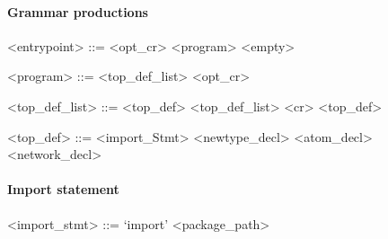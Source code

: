 \newcommand{\pn}[1]{\langle \textnormal{#1} \rangle}
\newcommand{\pp}{\models}
\newcommand{\oo}{\; \mid \;}
\newcommand{\sk}{\dots }
\newcommand{\ww}{\;}
\newcommand{\nn}{\perp}
\newcommand{\sm}[1]{\textnormal{#1}}
\newcommand{\sd}[1]{\textnormal{\it #1}}



\newcommand{\tn}[1]{`{#1}'}
\newcommand{\vs}[0]{\vspace{-12pt}}
\setlength{\grammarparsep}{20pt plus 1pt minus 1pt}
\setlength{\grammarindent}{12em}





\paragraph{Grammar productions}

\begin{grammar}
  <entrypoint> ::= <opt_cr> <program>
  \alt <empty>
\end{grammar}

\vs

\begin{grammar}
    <program> ::= <top_def_list> <opt_cr>
\end{grammar}

\vs

\begin{grammar}
  <top_def_list> ::= <top_def>
  \alt <top_def_list> <cr> <top_def>
\end{grammar}

\vs

\begin{grammar}
  <top_def> ::= <import_Stmt>
  \alt <newtype_decl>
  \alt <atom_decl>
  \alt <network_decl>
\end{grammar}


\paragraph{Import statement}

\begin{grammar}
  <import_stmt> ::= `import' <package_path>
\end{grammar}

